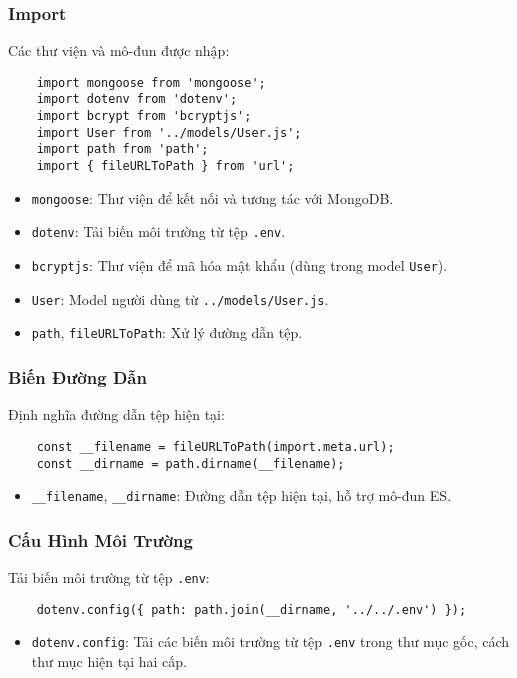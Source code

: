             \subsubsection{Import}
                \hspace*{0.6cm}Các thư viện và mô-đun được nhập:
                \begin{lstlisting}
    import mongoose from 'mongoose';
    import dotenv from 'dotenv';
    import bcrypt from 'bcryptjs';
    import User from '../models/User.js';
    import path from 'path';
    import { fileURLToPath } from 'url';
                \end{lstlisting}
                \begin{itemize}
                    \item \texttt{mongoose}: Thư viện để kết nối và tương tác với MongoDB.
                    \item \texttt{dotenv}: Tải biến môi trường từ tệp \texttt{.env}.
                    \item \texttt{bcryptjs}: Thư viện để mã hóa mật khẩu (dùng trong model \texttt{User}).
                    \item \texttt{User}: Model người dùng từ \texttt{../models/User.js}.
                    \item \texttt{path}, \texttt{fileURLToPath}: Xử lý đường dẫn tệp.
                \end{itemize}

            \subsubsection{Biến Đường Dẫn}
                \hspace*{0.6cm}Định nghĩa đường dẫn tệp hiện tại:
                \begin{lstlisting}
    const __filename = fileURLToPath(import.meta.url);
    const __dirname = path.dirname(__filename);
                \end{lstlisting}
                \begin{itemize}
                    \item \texttt{\_\_filename}, \texttt{\_\_dirname}: Đường dẫn tệp hiện tại, hỗ trợ mô-đun ES.
                \end{itemize}

            \subsubsection{Cấu Hình Môi Trường}
                \hspace*{0.6cm}Tải biến môi trường từ tệp \texttt{.env}:
                \begin{lstlisting}
    dotenv.config({ path: path.join(__dirname, '../../.env') });
                \end{lstlisting}
                \begin{itemize}
                    \item \texttt{dotenv.config}: Tải các biến môi trường từ tệp \texttt{.env} trong thư mục gốc, cách thư mục hiện tại hai cấp.
                \end{itemize}

